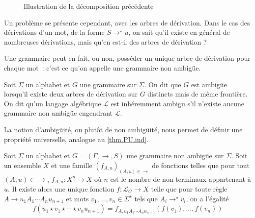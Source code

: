 \begin{figure}[ht]
  \centering
  \caption{Illustration de la décomposition précédente}
\end{figure}

Un problème se présente cependant, avec les arbres de dérivation. Dans le cas
des dérivations d'un mot, de la forme $S\to^\star u$, on sait qu'il existe en
général de nombreuses dérivations, mais qu'en est-il des arbres de dérivation ?

Une grammaire peut en fait, ou non, posséder un unique arbre de dérivation pour
chaque mot~: c'est ce qu'on appelle une grammaire non ambigüe.

\begin{definition}[Ambigüité]
  Soit $\Sigma$ un alphabet et $G$ une grammaire sur $\Sigma$. On dit que $G$
  est ambigüe lorsqu'il existe deux arbres de dérivation sur $G$ distincts mais
  de même frontière. On dit qu'un langage algébrique $\mathcal L$ est
  inhéremment ambigu s'il n'existe aucune grammaire non ambigüe engendrant
  $\mathcal L$.
\end{definition}

La notion d'ambigüité, ou plutôt de non ambigüité, nous permet de définir une
propriété universelle, analogue au \cref{thm.PU.ind}.

\begin{proposition}
  Soit $\Sigma$ un alphabet et $G=(\Gamma,\to,S)$ une grammaire non ambigüe sur
  $\Sigma$. Soit un ensemble $X$ et une famille $(f_{A,u})_{(A,u) \in \to}$ de
  fonctions telles que pour tout $(A,u) \in \to$, $f_{A,u} : X^n \to X$ où $n$
  est le nombre de non terminaux appartenant à $u$. Il existe alors une unique
  fonction $f : \mathcal L_G \to X$ telle que pour toute règle
  $A \to u_1A_1\cdots A_nu_{n+1}$ et mots $v_1,\ldots,v_n\in\Sigma^\star$ tels que
  $A_i \to^\star v_i$, on a l'égalité
  \[f(u_1\star v_1\star\cdots\star v_n u_{n+1}) =
  f_{A,u_1A_1\cdots A_nu_{n+1}}(f(v_1),\ldots,f(v_n))\]
\end{proposition}

